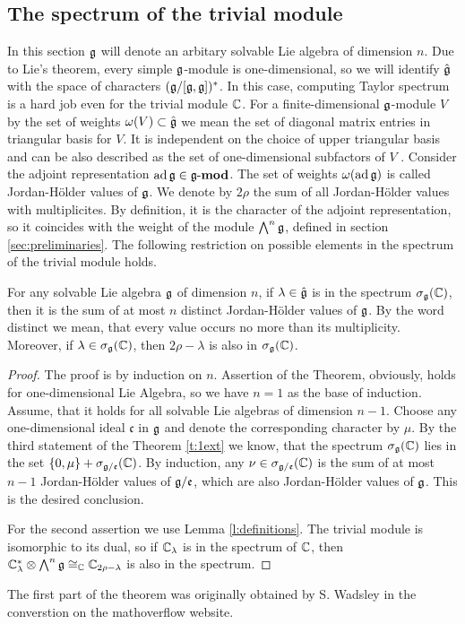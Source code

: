 \subsection{The spectrum of the trivial module}
In this section $\mathfrak{g}$ will denote an arbitary solvable Lie algebra of dimension $n$. Due to Lie's
theorem, every simple $\mathfrak{g}$-module is one-dimensional, so we will identify $\hat{\mathfrak{g}}$ with the
space of characters $(\mathfrak{g}/[\mathfrak{g},\mathfrak{g}])^*$. In this case, computing Taylor spectrum is a hard
job even for the trivial module $\mathbb{C}$. For a finite-dimensional $\mathfrak{g}$-module $V$ by the set of
weights $\omega(V) \subset \hat{\mathfrak{g}}$ we mean the set of diagonal matrix entries in triangular
basis for $V$. It is independent on the choice of upper triangular basis and can be also described
as the set of one-dimensional subfactors of $V$ \cite{humphreys}. Consider the adjoint
representation $\operatorname{ad}\mathfrak{g} \in \operatorname{\mathbf{\mathfrak{g}-mod}}$. The set of weights $\omega(\operatorname{ad}\mathfrak{g})$ is called
Jordan-H{\"o}lder values of $\mathfrak{g}$.  We denote by $2\rho$ the sum of all Jordan-H{\"o}lder values
with multiplicites. By definition, it is the character of the adjoint representation, so it
coincides with  the weight of the module $\bigwedge^n\mathfrak{g}$, defined in section
\ref{sec:preliminaries}.  The following restriction on possible elements in the spectrum of the
trivial module holds.
\begin{theorem} \label{t:jordanholder}
    For any solvable Lie algebra $\mathfrak{g}$ of dimension $n$, if $\lambda \in \hat{\mathfrak{g}}$ is in the
    spectrum $\sigma_{\mathfrak{g}}(\mathbb{C})$, then it is the sum of at most $n$ distinct Jordan-H{\"o}lder
    values of $\mathfrak{g}$. By the word distinct we mean, that every value occurs no more than its
    multiplicity.  Moreover, if $\lambda \in \sigma_{\mathfrak{g}}(\mathbb{C})$, then $2\rho - \lambda$ is also in
    $\sigma_{\mathfrak{g}}(\mathbb{C})$.
\end{theorem}
\begin{proof}
    The proof is by induction on $n$. Assertion of the Theorem, obviously, holds for
    one-dimensional Lie Algebra, so we have $n=1$ as the base of induction. Assume, that it holds
    for all solvable Lie algebras of dimension $n-1$. Choose any one-dimensional ideal
    $\mathfrak{c}$ in $\mathfrak{g}$ and denote the corresponding character by $\mu$. By the third
    statement of the Theorem \ref{t:1ext} we know, that the spectrum $\sigma_{\mathfrak{g}}(\mathbb{C})$ lies in
    the set $\{0, \mu\} + \sigma_{\mathfrak{g}/\mathfrak{e}}(\mathbb{C})$. By induction, any $\nu \in
    \sigma_{\mathfrak{g}/\mathfrak{e}}(\mathbb{C})$ is the sum of at most $n-1$ Jordan-H{\"o}lder values of
    $\mathfrak{g}/\mathfrak{e}$, which are also Jordan-H{\"o}lder values of $\mathfrak{g}$. This is the desired
    conclusion.

    For the second assertion we use Lemma \ref{l:definitions}. The trivial module is isomorphic to
    its dual, so if $\mathbb{C}_\lambda$ is in the spectrum of $\mathbb{C}$, then $\mathbb{C}_\lambda^* \otimes
    \bigwedge^n\mathfrak{g} \cong_{\mathbb{C}} \mathbb{C}_{2\rho - \lambda}$ is also in the spectrum.
\end{proof}
The first part of the theorem was originally obtained by S. Wadsley in the converstion on the
mathoverflow website.  

